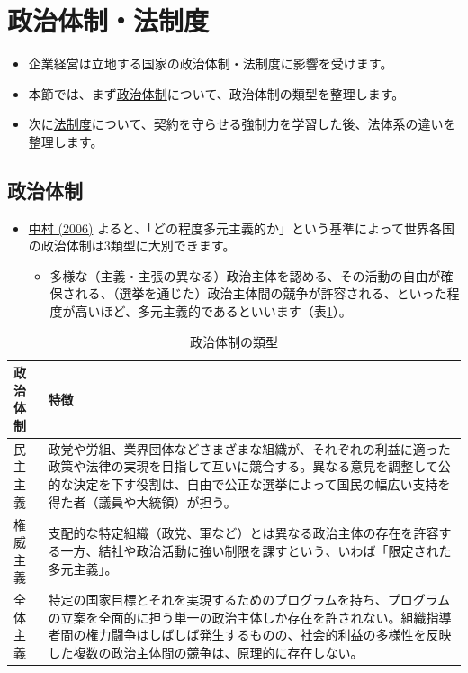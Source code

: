 \documentclass[
]{book}
\providecommand{\tightlist}{%
  \setlength{\itemsep}{0pt}\setlength{\parskip}{0pt}}
\begin{document}
\hypertarget{politics-and-law}{%
\section{政治体制・法制度}\label{politics-and-law}}

\begin{itemize}
\item
  企業経営は立地する国家の政治体制・法制度に影響を受けます。
\item
  本節では、まず\protect\hyperlink{politics}{政治体制}について、政治体制の類型を整理します。
\item
  次に\protect\hyperlink{law}{法制度}について、契約を守らせる強制力を学習した後、法体系の違いを整理します。
\end{itemize}

\hypertarget{politics}{%
\subsection{政治体制}\label{politics}}

\begin{itemize}
\item
  \href{https://www.ide.go.jp/Japanese/Research/Theme/Pol/Institutions/200608_nakamura.html}{中村 (2006)} よると、「どの程度多元主義的か」という基準によって世界各国の政治体制は3類型に大別できます。 　

  \begin{itemize}
  \tightlist
  \item
    多様な（主義・主張の異なる）政治主体を認める、その活動の自由が確保される、（選挙を通じた）政治主体間の競争が許容される、といった程度が高いほど、多元主義的であるといいます（表\ref{tab:regime}）。
  \end{itemize}
\end{itemize}

\begin{table}

\caption{\label{tab:regime}政治体制の類型}
\centering
\begin{tabular}[t]{>{\raggedright\arraybackslash}p{6em}|l}
\hline
政治体制 & 特徴\\
\hline
民主主義 & 政党や労組、業界団体などさまざまな組織が、それぞれの利益に適った政策や法律の実現を目指して互いに競合する。異なる意見を調整して公的な決定を下す役割は、自由で公正な選挙によって国民の幅広い支持を得た者（議員や大統領）が担う。\\
\hline
権威主義 & 支配的な特定組織（政党、軍など）とは異なる政治主体の存在を許容する一方、結社や政治活動に強い制限を課すという、いわば「限定された多元主義」。\\
\hline
全体主義 & 特定の国家目標とそれを実現するためのプログラムを持ち、プログラムの立案を全面的に担う単一の政治主体しか存在を許されない。組織指導者間の権力闘争はしばしば発生するものの、社会的利益の多様性を反映した複数の政治主体間の競争は、原理的に存在しない。\\
\hline
\end{tabular}
\end{table}
\end{document}
